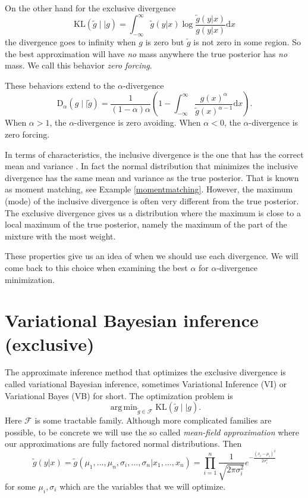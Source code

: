 \documentclass[12pt,vu]{adammath}
\newcommand\ddfrac[2]{\frac{\displaystyle #1}{\displaystyle #2}}
\newcommand\kl[2]{{\text{KL}({#1} \mid\mid {#2})}}
\newcommand\D[3]{{\text{D}_{#1}({#2} \mid\mid {#3})}}
\newcommand\Da[2]{\D{\alpha}{#1}{#2}}
\DeclareMathOperator*{\argmin}{arg\,min}
\theoremstyle{plain}
\theoremstyle{definition}
\theoremstyle{remark}
\begin{document}
On the other hand for the exclusive divergence
$$\kl{\tilde{g}}{g} = \int_{-\infty}^\infty \tilde{g}(y|x) \log \frac{\tilde{g}(y|x)}{g(y|x)} \mathrm{d}x$$
the divergence goes to infinity when $g$ is zero but $\tilde{g}$ is not zero in some region.
So the best approximation will have \emph{no} mass anywhere the true posterior has \emph{no} mass.
We call this behavior \emph{zero forcing}.

These behaviors extend to the $\alpha$-divergence
$$\Da{g}{\tilde{g}} = \frac{1}{(1-\alpha)\alpha}\left(1 - \int_{-\infty}^{\infty} \frac{g(x)^\alpha}{\tilde{g}(x)^{\alpha-1}} \mathrm{d} x\right).$$
When $\alpha > 1$, the $\alpha$-divergence is zero avoiding.
When $\alpha < 0$, the $\alpha$-divergence is zero forcing.

In terms of characteristics, the inclusive divergence is the one that has the correct mean and variance \cite{minkadiv}.
In fact the normal distribution that minimizes the inclusive divergence has the same mean and variance as the true posterior.
That is known as moment matching, see Example \ref{momentmatching}.
However, the maximum (mode) of the inclusive divergence is often very different from the true posterior.
The exclusive divergence gives us a distribution where the maximum is close to a local maximum of the true posterior, namely the maximum of the part of the mixture with the most weight.

These properties give us an idea of when we should use each divergence.
We will come back to this choice when examining the best $\alpha$ for $\alpha$-divergence minimization.

\section{Variational Bayesian inference (exclusive)}\label{vbi}
The approximate inference method that optimizes the exclusive divergence is called variational Bayesian inference, sometimes Variational Inference (VI) or Variational Bayes (VB) for short.
The optimization problem is
$$\argmin_{\tilde{g} \in \mathcal{F}} \kl{\tilde{g}}{g}.$$
Here $\mathcal{F}$ is some tractable family.
Although more complicated families are possible, to be concrete we will use the so called \emph{mean-field approximation} where our approximations are fully factored normal distributions.
Then
$$\tilde{g}(y|x) = \tilde{g}(\mu_1, ..., \mu_n, \sigma_i, ..., \sigma_n | x_1, ..., x_n) = \prod_{i=1}^n \frac{1}{\sqrt {2\pi \sigma_i^2}} e^{-{\ddfrac {(x_i-\mu_i )^{2}}{2\sigma_i^2}}}$$
for some $\mu_i, \sigma_i$ which are the variables that we will optimize.
\end{document}
